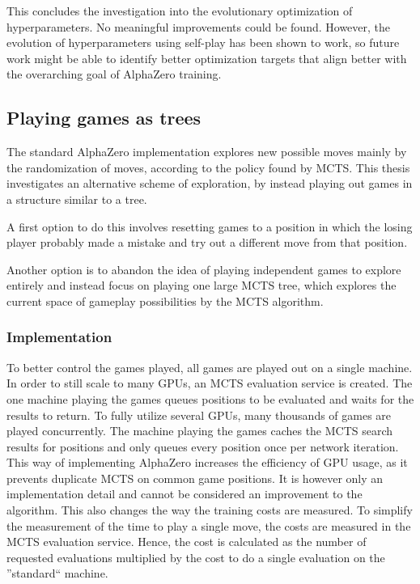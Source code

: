 \documentclass[12pt,onecolumn,oneside,titlepage]{article}
\begin{document}
This concludes the investigation into the evolutionary optimization of hyperparameters. No meaningful improvements could be found. However, the evolution of hyperparameters using self-play has been shown to work,
so future work might be able to identify better optimization targets that align better with the overarching goal of AlphaZero training.


\subsection{Playing games as trees}

The standard AlphaZero implementation explores new possible moves mainly by the randomization of moves, according to the policy found by MCTS.
This thesis investigates an alternative scheme of exploration, by instead playing out games in a structure similar to a tree.

A first option to do this involves resetting games to a position in which the losing player probably made a mistake and try out a different move from that position.

Another option is to abandon the idea of playing independent games to explore entirely and instead focus on playing one large MCTS tree, which explores the current space of gameplay possibilities by the MCTS algorithm.

\subsubsection{Implementation}

To better control the games played, all games are played out on a single machine. In order to still scale to many GPUs, 
an MCTS evaluation service is created. The one machine playing the games queues positions to be evaluated and waits for
the results to return. To fully utilize several GPUs, many thousands of games are played concurrently.
The machine playing the games caches the MCTS search results for positions and only queues every position once per network iteration. This 
way of implementing AlphaZero increases the efficiency of GPU usage, as it prevents duplicate MCTS on common game positions. It is however only an implementation detail and cannot be considered an improvement to the algorithm.
This also changes the way the training costs are measured. To simplify the measurement of the time to play a single move,
the costs are measured in the MCTS evaluation service. Hence, the cost is calculated as the number of requested evaluations multiplied
by the cost to do a single evaluation on the ''standard`` machine.
\end{document}
